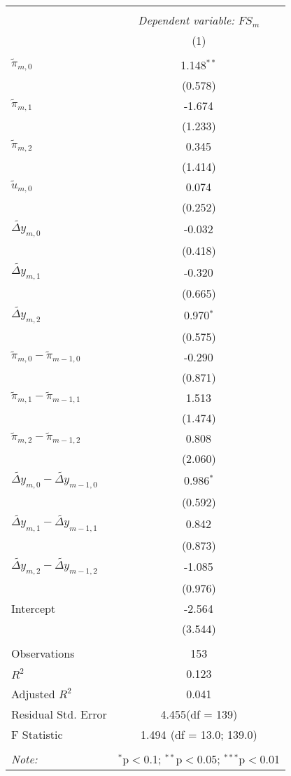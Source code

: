 \begin{tabular}{@{\extracolsep{5pt}}lc}
\\[-1.8ex]\hline
\hline \\[-1.8ex]
& \multicolumn{1}{c}{\textit{Dependent variable:} \(FS_m\)} \
\cr \cline{1-2}
\\[-1.8ex] & (1) \\
\hline \\[-1.8ex]
 \(\tilde{\pi}_{m,0}\) & 1.148$^{**}$ \\
  & (0.578) \\
 \(\tilde{\pi}_{m,1}\) & -1.674$^{}$ \\
  & (1.233) \\
 \(\tilde{\pi}_{m,2}\) & 0.345$^{}$ \\
  & (1.414) \\
 \(\tilde{u}_{m,0}\) & 0.074$^{}$ \\
  & (0.252) \\
 \(\widetilde{\Delta y}_{m,0}\) & -0.032$^{}$ \\
  & (0.418) \\
 \(\widetilde{\Delta y}_{m,1}\) & -0.320$^{}$ \\
  & (0.665) \\
 \(\widetilde{\Delta y}_{m,2}\) & 0.970$^{*}$ \\
  & (0.575) \\
 \(\tilde{ \pi}_{m,0}-\tilde{ \pi}_{m-1,0}\) & -0.290$^{}$ \\
  & (0.871) \\
 \(\tilde{ \pi}_{m,1}-\tilde{ \pi}_{m-1,1}\) & 1.513$^{}$ \\
  & (1.474) \\
 \(\tilde{ \pi}_{m,2}-\tilde{ \pi}_{m-1,2}\) & 0.808$^{}$ \\
  & (2.060) \\
 \(\widetilde{\Delta y}_{m,0}-\widetilde{\Delta y}_{m-1,0}\) & 0.986$^{*}$ \\
  & (0.592) \\
 \(\widetilde{\Delta y}_{m,1}-\widetilde{\Delta y}_{m-1,1}\) & 0.842$^{}$ \\
  & (0.873) \\
 \(\widetilde{\Delta y}_{m,2}-\widetilde{\Delta y}_{m-1,2}\) & -1.085$^{}$ \\
  & (0.976) \\
 Intercept & -2.564$^{}$ \\
  & (3.544) \\
\hline \\[-1.8ex]
 Observations & 153 \\
 $R^2$ & 0.123 \\
 Adjusted $R^2$ & 0.041 \\
 Residual Std. Error & 4.455(df = 139)  \\
 F Statistic & 1.494$^{}$ (df = 13.0; 139.0) \\
\hline
\hline \\[-1.8ex]
\textit{Note:} & \multicolumn{1}{r}{$^{*}$p$<$0.1; $^{**}$p$<$0.05; $^{***}$p$<$0.01} \\
\end{tabular}